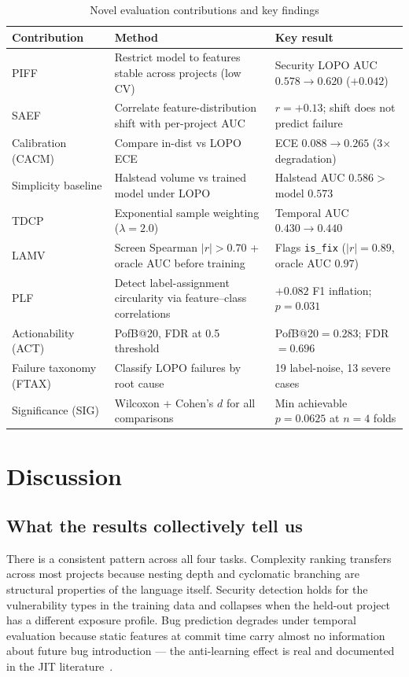 \documentclass[12pt, oneside]{report}
\begin{document}
\begin{table}[H]
\centering
\caption{Novel evaluation contributions and key findings}
\label{tab:novel}
\small
\begin{tabular}{@{}p{3.5cm}p{6cm}p{4cm}@{}}
\toprule
\textbf{Contribution} & \textbf{Method} & \textbf{Key result} \\
\midrule
PIFF & Restrict model to features stable across projects (low CV) & Security LOPO AUC $0.578 \to 0.620$ ($+0.042$) \\
SAEF & Correlate feature-distribution shift with per-project AUC & $r = +0.13$; shift does not predict failure \\
Calibration (CACM) & Compare in-dist vs LOPO ECE & ECE $0.088 \to 0.265$ (3$\times$ degradation) \\
Simplicity baseline & Halstead volume vs trained model under LOPO & Halstead AUC $0.586 >$ model $0.573$ \\
TDCP & Exponential sample weighting ($\lambda=2.0$) & Temporal AUC $0.430 \to 0.440$ \\
LAMV & Screen Spearman $|r|>0.70$ + oracle AUC before training & Flags \texttt{is\_fix} ($|r|=0.89$, oracle AUC $0.97$) \\
PLF & Detect label-assignment circularity via feature--class correlations & $+0.082$ F1 inflation; $p=0.031$ \\
Actionability (ACT) & PofB@20, FDR at 0.5 threshold & PofB@20$=0.283$; FDR$=0.696$ \\
Failure taxonomy (FTAX) & Classify LOPO failures by root cause & 19 label-noise, 13 severe cases \\
Significance (SIG) & Wilcoxon + Cohen's $d$ for all comparisons & Min achievable $p=0.0625$ at $n=4$ folds \\
\bottomrule
\end{tabular}
\end{table}

\section{Discussion}
\label{sec:discussion}

\subsection{What the results collectively tell us}

There is a consistent pattern across all four tasks. Complexity ranking transfers across most projects because nesting depth and cyclomatic branching are structural properties of the language itself. Security detection holds for the vulnerability types in the training data and collapses when the held-out project has a different exposure profile. Bug prediction degrades under temporal evaluation because static features at commit time carry almost no information about future bug introduction — the anti-learning effect is real and documented in the JIT literature~\cite{kamei2013, d2010}.
\end{document}
